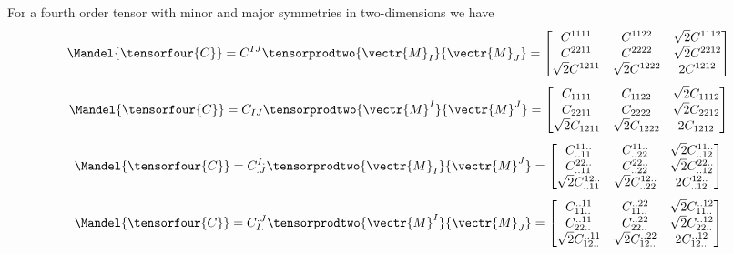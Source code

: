 For a fourth order tensor with minor and major symmetries in two-dimensions we have
\begin{equation}
  \Mandel{\tensorfour{C}}=C^{IJ}\tensorprodtwo{\vectr{M}_{I}}{\vectr{M}_{J}}=\begin{bmatrix}
    C^{1111} & C^{1122} & \sqrt{2}C^{1112} \\
    C^{2211} & C^{2222} & \sqrt{2}C^{2212} \\
    \sqrt{2}C^{1211} & \sqrt{2}C^{1222} & 2C^{1212}     
  \end{bmatrix}
\end{equation}
\begin{equation}
  \Mandel{\tensorfour{C}}=C_{IJ}\tensorprodtwo{\vectr{M}^{I}}{\vectr{M}^{J}}=\begin{bmatrix}
    C_{1111} & C_{1122} & \sqrt{2}C_{1112} \\
    C_{2211} & C_{2222} & \sqrt{2}C_{2212} \\
    \sqrt{2}C_{1211} & \sqrt{2}C_{1222} & 2C_{1212}     
  \end{bmatrix}
\end{equation}
\begin{equation}
  \Mandel{\tensorfour{C}}=C^{I.}_{.J}\tensorprodtwo{\vectr{M}_{I}}{\vectr{M}^{J}}=\begin{bmatrix}
    C^{11..}_{..11} & C^{11..}_{..22} & \sqrt{2}C^{11..}_{..12} \\
    C^{22..}_{..11} & C^{22..}_{..22} & \sqrt{2}C^{22..}_{..12} \\
    \sqrt{2}C^{12..}_{..11} & \sqrt{2}C^{12..}_{..22} & 2C^{12..}_{..12}     
  \end{bmatrix}
\end{equation}
\begin{equation}
  \Mandel{\tensorfour{C}}=C^{.J}_{I.}\tensorprodtwo{\vectr{M}^{I}}{\vectr{M}_{J}}=\begin{bmatrix}
    C^{..11}_{11..} & C^{..22}_{11..} & \sqrt{2}C^{..12}_{11..} \\
    C^{..11}_{22..} & C^{..22}_{22..} & \sqrt{2}C^{..12}_{22..} \\
    \sqrt{2}C^{..11}_{12..} & \sqrt{2}C^{..22}_{12..} & 2C^{..12}_{12..}     
  \end{bmatrix}
\end{equation}

